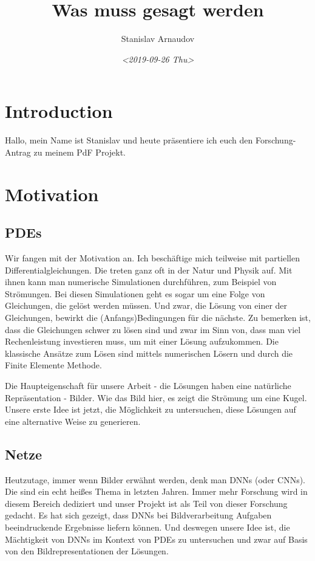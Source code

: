 \documentclass[margin=0.05in, tmargin=0.01in]{article}
\author{Stanislav Arnaudov}
\date{\textit{<2019-09-26 Thu>}}
\title{Was muss gesagt werden}
\begin{document}
\maketitle



\section{Introduction}
\label{sec:org7efff8f}
Hallo, mein Name ist Stanislav und heute präsentiere ich euch den Forschung-Antrag zu meinem PdF Projekt.


\section{Motivation}
\label{sec:orga66f5f0}

\subsection{PDEs}
\label{sec:orgfc5d8d0}
Wir fangen mit der Motivation an. Ich beschäftige mich teilweise mit partiellen Differentialgleichungen. Die treten ganz oft in der Natur und Physik auf. Mit ihnen kann man numerische Simulationen durchführen, zum Beispiel von Strömungen. Bei diesen Simulationen geht es sogar um eine Folge von Gleichungen, die gelöst werden müssen. Und zwar, die Lösung von einer der Gleichungen, bewirkt die (Anfangs)Bedingungen für die nächste. Zu bemerken ist, dass die Gleichungen schwer zu lösen sind und zwar im Sinn von, dass man viel Rechenleistung investieren muss, um mit einer Lösung aufzukommen. Die klassische Ansätze zum Lösen sind mittels numerischen Lösern und durch die Finite Elemente Methode.

Die Haupteigenschaft für unsere Arbeit - die Lösungen haben eine natürliche Repräsentation - Bilder. Wie das Bild hier, es zeigt die Strömung um eine Kugel. Unsere erste Idee ist jetzt, die Möglichkeit zu untersuchen, diese Lösungen auf eine alternative Weise zu generieren. 


\subsection{Netze}
\label{sec:org5cd85d4}
Heutzutage, immer wenn Bilder erwähnt werden, denk man DNNs (oder CNNs). Die sind ein echt heißes Thema in letzten Jahren. Immer mehr Forschung wird in diesem Bereich dediziert und unser Projekt ist als Teil von dieser Forschung gedacht. Es hat sich gezeigt, dass DNNs bei Bildverarbeitung Aufgaben beeindruckende Ergebnisse liefern können. Und deswegen unsere Idee ist, die Mächtigkeit von DNNs im Kontext von PDEs zu untersuchen und zwar auf Basis von den Bildrepresentationen der Lösungen.
\end{document}
